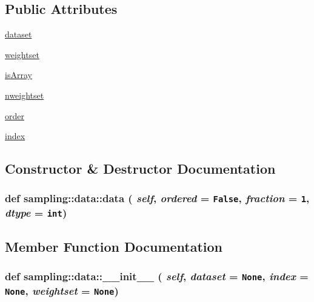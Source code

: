 \subsection*{Public Attributes}
\begin{CompactItemize}
\item 
\hyperlink{classsampling_1_1data_160aaf82abdd3a24d5a830dc1b0ed378}{dataset}
\item 
\hyperlink{classsampling_1_1data_837dbe448267fb2e235d6a398b196d54}{weightset}
\item 
\hyperlink{classsampling_1_1data_223cf6ee3aba8358113a5102faa2a0a4}{isArray}
\item 
\hyperlink{classsampling_1_1data_2ab52d0cab7a32cef923f0669a1c8bdc}{nweightset}
\item 
\hyperlink{classsampling_1_1data_eda6d7c1dcf0af8f69404e3bdc72c324}{order}
\item 
\hyperlink{classsampling_1_1data_59d39eb206fcc37334749abc5f223b89}{index}
\end{CompactItemize}


\subsection{Constructor \& Destructor Documentation}
\hypertarget{classsampling_1_1data_6b0070f25fb05379d9ab4847e6d7d7ca}{
\subsubsection[{data}]{\setlength{\rightskip}{0pt plus 5cm}def sampling::data::data ( {\em self}, \/   {\em ordered} = {\tt False}, \/   {\em fraction} = {\tt 1}, \/   {\em dtype} = {\tt int})}}
\label{classsampling_1_1data_6b0070f25fb05379d9ab4847e6d7d7ca}




\subsection{Member Function Documentation}
\hypertarget{classsampling_1_1data_c53c5f40743a4e9972bbea4814133163}{
\subsubsection[{\_\-\_\-init\_\-\_\-}]{\setlength{\rightskip}{0pt plus 5cm}def sampling::data::\_\-\_\-init\_\-\_\- ( {\em self}, \/   {\em dataset} = {\tt None}, \/   {\em index} = {\tt None}, \/   {\em weightset} = {\tt None})}}
\label{classsampling_1_1data_c53c5f40743a4e9972bbea4814133163}


